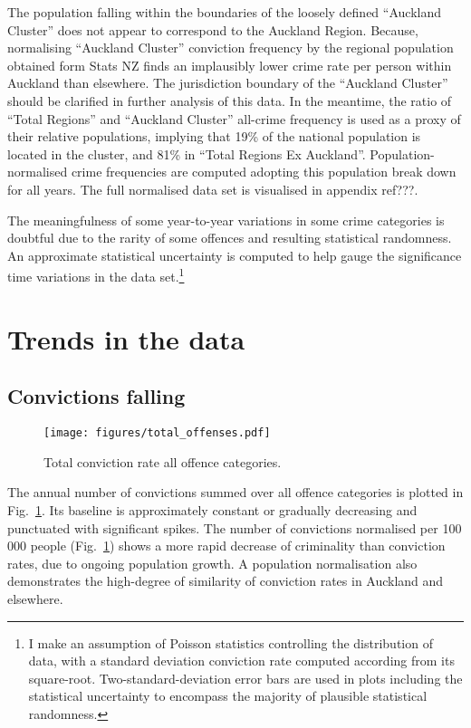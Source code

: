\documentclass[onecolumn]{myarticle}
\begin{document}
The population falling within the boundaries of the loosely defined ``Auckland Cluster'' does not appear to correspond to the Auckland Region.
Because, normalising ``Auckland Cluster'' conviction frequency by the regional population obtained form Stats NZ finds an implausibly lower crime rate per person within Auckland than elsewhere.
The jurisdiction boundary of the ``Auckland Cluster'' should be clarified in further analysis of this data.
In the meantime, the ratio of ``Total Regions'' and ``Auckland Cluster'' all-crime frequency is used as a proxy of their relative populations, implying that 19\% of the national population is located in the cluster, and 81\% in ``Total Regions Ex Auckland''.
Population-normalised crime frequencies are computed adopting this population break down for all years.
The full normalised data set is visualised in appendix ref???.

The meaningfulness of some year-to-year variations in some crime categories is doubtful due to the rarity of some offences and resulting statistical randomness.
An approximate statistical uncertainty is computed to help gauge the significance time variations in the data set.\footnote{I make an assumption of Poisson statistics controlling the distribution of data, with a standard deviation conviction rate computed according from its square-root.  
Two-standard-deviation error bars are used in plots including the statistical uncertainty to encompass the majority of plausible statistical randomness.}

\section*{Trends in the data}

\subsection*{Convictions falling}
\begin{figure}
  \centering
  \texttt{[image: figures/total\_offenses.pdf]}
  \caption{Total conviction rate all offence categories.}
  \label{fig:total crime}
\end{figure}

The annual number of convictions summed over all offence categories is plotted in Fig.~\ref{fig:total crime}.
Its baseline is approximately constant or gradually decreasing and punctuated with significant spikes.
The number of convictions normalised per 100$\,$000 people (Fig.~\ref{fig:total crime}) shows a more rapid decrease of criminality than conviction rates, due to ongoing population growth.
A population normalisation also demonstrates the high-degree of similarity of conviction rates in Auckland and elsewhere.
\end{document}
